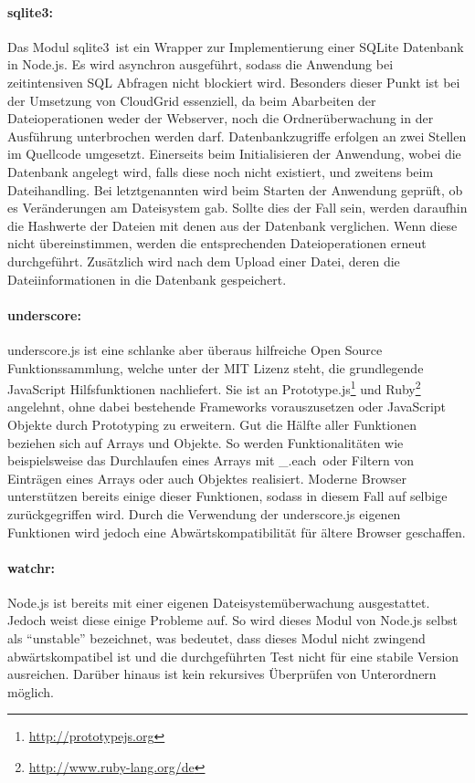 \paragraph{sqlite3:}Das Modul \frqq sqlite3\flqq\ ist ein Wrapper zur Implementierung einer SQLite Datenbank in Node.js.
Es wird asynchron ausgeführt, sodass die Anwendung bei zeitintensiven SQL Abfragen nicht blockiert wird.
Besonders dieser Punkt ist bei der Umsetzung von CloudGrid essenziell, da beim Abarbeiten der Dateioperationen weder der Webserver, noch die Ordnerüberwachung in der Ausführung unterbrochen werden darf.
Datenbankzugriffe erfolgen an zwei Stellen im Quellcode umgesetzt.
Einerseits beim Initialisieren der Anwendung, wobei die Datenbank angelegt wird, falls diese noch nicht existiert, und zweitens beim Dateihandling.
Bei letztgenannten wird beim Starten der Anwendung geprüft, ob es Veränderungen am Dateisystem gab.
Sollte dies der Fall sein, werden daraufhin die Hashwerte der Dateien mit denen aus der Datenbank verglichen.
Wenn diese nicht übereinstimmen, werden die entsprechenden Dateioperationen erneut durchgeführt.
Zusätzlich wird nach dem Upload einer Datei, deren die Dateiinformationen in die Datenbank gespeichert.

\paragraph{underscore:}underscore.js ist eine schlanke aber überaus hilfreiche Open Source Funktionssammlung, welche unter der MIT Lizenz steht, die grundlegende JavaScript Hilfsfunktionen nachliefert.
Sie ist an Prototype.js\footnote{\url{http://prototypejs.org}} und Ruby\footnote{\url{http://www.ruby-lang.org/de}} angelehnt, ohne dabei bestehende Frameworks vorauszusetzen oder JavaScript Objekte durch Prototyping zu erweitern.
Gut die Hälfte aller Funktionen beziehen sich auf Arrays und Objekte.
So werden Funktionalitäten wie beispielsweise das Durchlaufen eines Arrays mit \frqq \_.each\flqq\ oder Filtern von Einträgen eines Arrays oder auch Objektes realisiert.
Moderne Browser unterstützen bereits einige dieser Funktionen, sodass in diesem Fall auf selbige zurückgegriffen wird.
Durch die Verwendung der underscore.js eigenen Funktionen wird jedoch eine Abwärtskompatibilität für ältere Browser geschaffen.

\paragraph{watchr:}Node.js ist bereits mit einer eigenen Dateisystemüberwachung ausgestattet.
Jedoch weist diese einige Probleme auf.
So wird dieses Modul von Node.js selbst als "`unstable"' bezeichnet, was bedeutet, dass dieses Modul nicht zwingend abwärtskompatibel ist und die durchgeführten Test nicht für eine stabile Version ausreichen.
Darüber hinaus ist kein rekursives Überprüfen von Unterordnern möglich.

